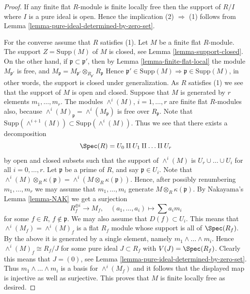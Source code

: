 \begin{proof}
If any finite flat $R$-module is finite locally free then the support
of $R/I$ where $I$ is a pure ideal is open. Hence the implication
(2) $\Rightarrow$ (1) follows from
Lemma \ref{lemma-pure-ideal-determined-by-zero-set}.

\medskip\noindent
For the converse assume that $R$ satisfies (1).
Let $M$ be a finite flat $R$-module.
The support $Z = \text{Supp}(M)$ of $M$ is closed, see
Lemma \ref{lemma-support-closed}.
On the other hand, if $\mathfrak p \subset \mathfrak p'$, then by
Lemma \ref{lemma-finite-flat-local}
the module $M_{\mathfrak p'}$ is free, and
$M_{\mathfrak p} = M_{\mathfrak p'} \otimes_{R_{\mathfrak p'}} R_{\mathfrak p}$
Hence
$\mathfrak p' \in \text{Supp}(M) \Rightarrow \mathfrak p \in \text{Supp}(M)$,
in other words, the support is closed under generalization.
As $R$ satisfies (1) we see that the support of $M$ is open and closed.
Suppose that $M$ is generated by $r$ elements $m_1, \ldots, m_r$.
The modules $\wedge^i(M)$, $i = 1, \ldots, r$ are finite flat $R$-modules
also, because $\wedge^i(M)_{\mathfrak p} = \wedge^i(M_{\mathfrak p})$
is free over $R_{\mathfrak p}$. Note that
$\text{Supp}(\wedge^{i + 1}(M)) \subset \text{Supp}(\wedge^i(M))$.
Thus we see that there exists a decomposition
$$
\Spec(R) = U_0 \amalg U_1 \amalg \ldots \amalg U_r
$$
by open and closed subsets such that the support of
$\wedge^i(M)$ is $U_r \cup \ldots \cup U_i$ for all $i = 0, \ldots, r$.
Let $\mathfrak p$ be a prime of $R$, and say $\mathfrak p \in U_i$.
Note that
$\wedge^i(M) \otimes_R \kappa(\mathfrak p) =
\wedge^i(M \otimes_R \kappa(\mathfrak p))$.
Hence, after possibly renumbering $m_1, \ldots, m_r$ we may assume that
$m_1, \ldots, m_i$ generate $M \otimes_R \kappa(\mathfrak p)$. By
Nakayama's Lemma \ref{lemma-NAK}
we get a surjection
$$
R_f^{\oplus i} \longrightarrow M_f, \quad
(a_1, \ldots, a_i) \longmapsto \sum a_im_i
$$
for some $f \in R$, $f \not \in \mathfrak p$. We may also assume that
$D(f) \subset U_i$. This means that $\wedge^i(M_f) = \wedge^i(M)_f$
is a flat $R_f$ module whose support is all of $\Spec(R_f)$.
By the above it is generated by a single element, namely
$m_1 \wedge \ldots \wedge m_i$. Hence $\wedge^i(M)_f \cong R_f/J$
for some pure ideal $J \subset R_f$ with $V(J) = \Spec(R_f)$.
Clearly this means that $J = (0)$, see
Lemma \ref{lemma-pure-ideal-determined-by-zero-set}.
Thus $m_1 \wedge \ldots \wedge m_i$ is a basis for
$\wedge^i(M_f)$ and it follows that the displayed map is injective
as well as surjective. This proves that $M$ is finite locally free
as desired.
\end{proof}







